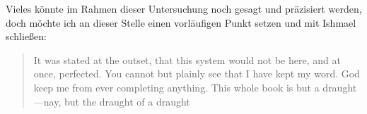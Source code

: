 Vieles könnte im Rahmen dieser Untersuchung noch gesagt und präzisiert werden,
doch möchte ich an dieser Stelle einen vorläufigen Punkt setzen und mit Ishmael
schließen: \foreignblockcquote{english}[159]{melville:mobydick}{It was stated
at the outset, that this system would not be here, and at once, perfected. You
cannot but plainly see that I have kept my word.
\textelp{}
God keep me from ever completing anything. This whole book is but a
draught---nay, but the draught of a draught}. %
